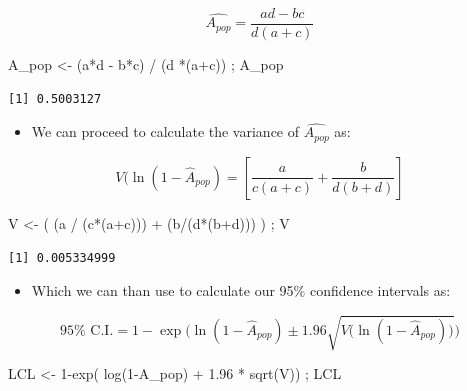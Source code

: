 \documentclass[
  letterpaper,
  DIV=11,
  numbers=noendperiod]{scrartcl}
\newenvironment{Shaded}{\begin{snugshade}}{\end{snugshade}}
\newcommand{\DecValTok}[1]{\textcolor[rgb]{0.68,0.00,0.00}{#1}}
\newcommand{\FloatTok}[1]{\textcolor[rgb]{0.68,0.00,0.00}{#1}}
\newcommand{\FunctionTok}[1]{\textcolor[rgb]{0.28,0.35,0.67}{#1}}
\newcommand{\NormalTok}[1]{\textcolor[rgb]{0.00,0.23,0.31}{#1}}
\newcommand{\OtherTok}[1]{\textcolor[rgb]{0.00,0.23,0.31}{#1}}
\newcommand{\SpecialCharTok}[1]{\textcolor[rgb]{0.37,0.37,0.37}{#1}}
\providecommand{\tightlist}{%
  \setlength{\itemsep}{0pt}\setlength{\parskip}{0pt}}\usepackage{longtable,booktabs,array}
\begin{document}
\[
\hat{A_{pop}} = \frac{ad-bc}{d(a+c)}
\]

\begin{Shaded}
\begin{Highlighting}[]
\NormalTok{A\_pop }\OtherTok{\textless{}{-}}\NormalTok{ (a}\SpecialCharTok{*}\NormalTok{d }\SpecialCharTok{{-}}\NormalTok{ b}\SpecialCharTok{*}\NormalTok{c) }\SpecialCharTok{/}\NormalTok{ (d }\SpecialCharTok{*}\NormalTok{(a}\SpecialCharTok{+}\NormalTok{c)) ; A\_pop}
\end{Highlighting}
\end{Shaded}

\begin{verbatim}
[1] 0.5003127
\end{verbatim}

\begin{itemize}
\tightlist
\item
  We can proceed to calculate the variance of \(\hat{A_{pop}}\) as:
\end{itemize}

\[
V(\ln(1-\hat{A}_{pop}) =  \left[ \frac{a}{c(a+c)}+\frac{b}{d(b+d)} \right]
\]

\begin{Shaded}
\begin{Highlighting}[]
\NormalTok{V }\OtherTok{\textless{}{-}}\NormalTok{  ( (a }\SpecialCharTok{/}\NormalTok{ (c}\SpecialCharTok{*}\NormalTok{(a}\SpecialCharTok{+}\NormalTok{c))) }\SpecialCharTok{+}\NormalTok{ (b}\SpecialCharTok{/}\NormalTok{(d}\SpecialCharTok{*}\NormalTok{(b}\SpecialCharTok{+}\NormalTok{d))) ) ; V}
\end{Highlighting}
\end{Shaded}

\begin{verbatim}
[1] 0.005334999
\end{verbatim}

\begin{itemize}
\tightlist
\item
  Which we can than use to calculate our 95\% confidence intervals as:
\end{itemize}

\[
95\% \text{ C.I.} = 
1 - \exp\biggl( \ln(1-\hat{A}_{pop}) \pm 1.96 \sqrt{V\biggl(\ln(1-\hat{A}_{pop} )\biggl)} \biggr)
\]

\begin{Shaded}
\begin{Highlighting}[]
\NormalTok{LCL }\OtherTok{\textless{}{-}}  \DecValTok{1}\SpecialCharTok{{-}}\FunctionTok{exp}\NormalTok{( }\FunctionTok{log}\NormalTok{(}\DecValTok{1}\SpecialCharTok{{-}}\NormalTok{A\_pop) }\SpecialCharTok{+} \FloatTok{1.96} \SpecialCharTok{*} \FunctionTok{sqrt}\NormalTok{(V))  ; LCL}
\end{Highlighting}
\end{Shaded}
\end{document}
